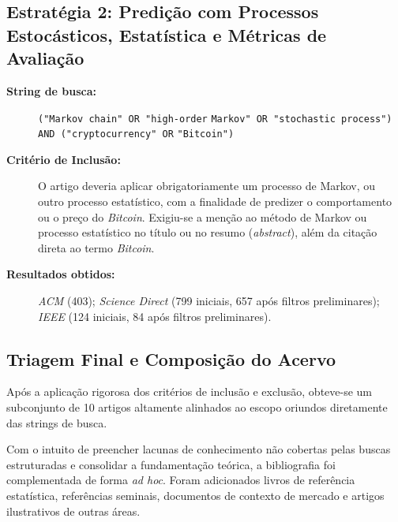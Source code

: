 \documentclass[
    12pt,                %
    openright,           %
    oneside,             %
    a4paper,             %
    english,             %
    brazil               %
]{abntex2}
\begin{document}
\subsection{Estratégia 2: Predição com Processos Estocásticos, Estatística e Métricas de Avaliação}
\begin{description}
    \item[\textbf{String de busca:}] \texttt{("Markov chain" OR "high-order} \texttt{Markov" OR "stochastic process")} \texttt{AND ("cryptocurrency" OR} \texttt{"Bitcoin")}
    \item[\textbf{Critério de Inclusão:}] O artigo deveria aplicar obrigatoriamente um processo de Markov, ou outro processo estatístico, com a finalidade de predizer o comportamento ou o preço do \textit{Bitcoin}. Exigiu-se a menção ao método de Markov ou processo estatístico no título ou no resumo (\textit{abstract}), além da citação direta ao termo \textit{Bitcoin}.
    \item[\textbf{Resultados obtidos:}] \textit{ACM} (403); \textit{Science Direct} (799 iniciais, 657 após filtros preliminares); \textit{IEEE} (124 iniciais, 84 após filtros preliminares).
\end{description}

\subsection{Triagem Final e Composição do Acervo}
Após a aplicação rigorosa dos critérios de inclusão e exclusão, obteve-se um subconjunto de 10 artigos altamente alinhados ao escopo oriundos diretamente das strings de 
busca.

Com o intuito de preencher lacunas de conhecimento não cobertas pelas buscas estruturadas e consolidar a fundamentação teórica, a bibliografia foi complementada de 
forma \textit{ad hoc}. Foram adicionados livros de referência estatística, referências seminais, documentos de contexto de mercado e artigos ilustrativos de outras áreas. 
\end{document}
